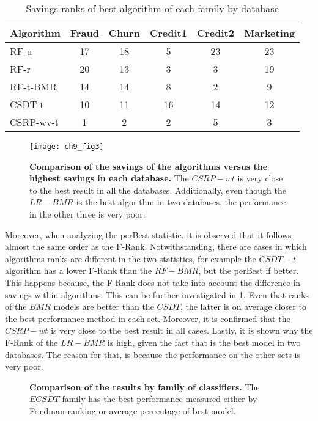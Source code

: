 {\begin{table}[!t]
  \end{table}
  \begin{table}[t]
    \centering
    \footnotesize
    \begin{tabular}{l c c c c c  } %
      \hline
      \bf{Algorithm} & \bf{Fraud} & \bf{Churn} &\bf{Credit1} & \bf{Credit2} & \bf{Marketing} \\
      \hline
      RF-u&17&18&5&23&23\\ 
      RF-r&20&13&3&3&19\\ 
      RF-t-BMR&14&14&8&2&9\\ 
      CSDT-t&10&11&16&14&12\\ 
      CSRP-wv-t&1&2&2&5&3\\ 
      \hline
    \end{tabular}
    \caption{Savings ranks of best algorithm of each family by database}
    \label{tab:9:results_best}
  \end{table}
 
  \begin{figure}[t]
    \centering
    \texttt{[image: ch9\_fig3]}
    \caption{\textbf{Comparison of the savings of the algorithms versus the highest savings in 
    each database.} The $CSRP-wt$ is very close to the best result in all the databases. 
    Additionally, even though the $LR-BMR$ is the best algorithm in two databases, the performance 
    in the other three is very poor.}
    \label{fig:9:comparison_best}
  \end{figure} 

  Moreover, when analyzing the perBest statistic, it is observed that it follows almost the same 
  order as the F-Rank. Notwithstanding, there are cases in which algorithms ranks are different in 
  the two statistics, for example the $CSDT-t$ algorithm has a lower F-Rank than the $RF-BMR$, 
  but the perBest if better. This happens because, the F-Rank does not take into account the 
  difference in savings within algorithms. This can be further investigated in \figurename{ 
  \ref{fig:9:comparison_best}}. Even that ranks of the $BMR$ models are better than the $CSDT$, the 
  latter is on average closer to the best performance method in each set. Moreover, it is confirmed 
  that the $CSRP-wt$ is very close to the best result in all cases. Lastly, it is shown why the 
  F-Rank of the $LR-BMR$ is high, given the fact that is the best model in two databases. The 
  reason  for that, is because the performance on the other sets is very poor.
  
\begin{figure}[!t]
  \centering
  \hfil
  \caption{\textbf{Comparison of the results by family of classifiers.} The $ECSDT$ family has the 
  best performance measured either by Friedman ranking or average percentage of best model.}
  \label{fig:9:comparison_family}
\end{figure}

}
